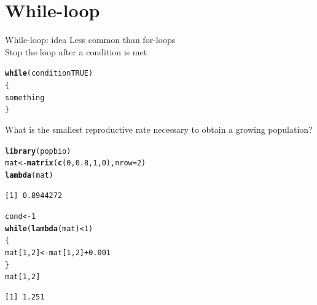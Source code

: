 \documentclass[10pt]{beamer}\usepackage[]{graphicx}\usepackage[]{color}
\makeatletter
\newcommand{\hlnum}[1]{\textcolor[rgb]{0.686,0.059,0.569}{#1}}%
\newcommand{\hlopt}[1]{\textcolor[rgb]{0,0,0}{#1}}%
\newcommand{\hlstd}[1]{\textcolor[rgb]{0.345,0.345,0.345}{#1}}%
\newcommand{\hlkwa}[1]{\textcolor[rgb]{0.161,0.373,0.58}{\textbf{#1}}}%
\newcommand{\hlkwb}[1]{\textcolor[rgb]{0.69,0.353,0.396}{#1}}%
\newcommand{\hlkwc}[1]{\textcolor[rgb]{0.333,0.667,0.333}{#1}}%
\newcommand{\hlkwd}[1]{\textcolor[rgb]{0.737,0.353,0.396}{\textbf{#1}}}%
\newenvironment{kframe}{%
 \def\at@end@of@kframe{}%
 \ifinner\ifhmode%
  \def\at@end@of@kframe{\end{minipage}}%
  \begin{minipage}{\columnwidth}%
 \fi\fi%
 \def\FrameCommand##1{\hskip\@totalleftmargin \hskip-\fboxsep
 \colorbox{shadecolor}{##1}\hskip-\fboxsep
     \hskip-\linewidth \hskip-\@totalleftmargin \hskip\columnwidth}%
 \MakeFramed {\advance\hsize-\width
   \@totalleftmargin\z@ \linewidth\hsize
   \@setminipage}}%
 {\par\unskip\endMakeFramed%
 \at@end@of@kframe}
\newenvironment{knitrout}{}{} %
\makeatother
\begin{document}

\section{While-loop}

\begin{frame}[fragile]{While-loop: idea}
Less common than for-loops\\
Stop the loop after a condition is met\\

\begin{knitrout}
\color{fgcolor}\begin{kframe}
\begin{alltt}
    \hlkwd{while}(condition TRUE)
    \{
      something
    \}
\end{alltt}
\end{kframe}
\end{knitrout}
  
\end{frame}

\begin{frame}[fragile]{What is the smallest reproductive rate necessary to obtain a growing population?}
\begin{knitrout}
\color{fgcolor}\begin{kframe}
\begin{alltt}
\hlkwd{library}\hlstd{(popbio)}
\hlstd{mat} \hlkwb{<-} \hlkwd{matrix}\hlstd{(}\hlkwd{c}\hlstd{(}\hlnum{0}\hlstd{,}\hlnum{0.8}\hlstd{,}\hlnum{1}\hlstd{,}\hlnum{0}\hlstd{),} \hlkwc{nrow} \hlstd{=} \hlnum{2}\hlstd{)}
\hlkwd{lambda}\hlstd{(mat)}
\end{alltt}
\begin{verbatim}
[1] 0.8944272
\end{verbatim}
\begin{alltt}
\hlstd{cond} \hlkwb{<-} \hlnum{1}
\hlkwa{while}\hlstd{(}\hlkwd{lambda}\hlstd{(mat)} \hlopt{<} \hlnum{1} \hlstd{)}
\hlstd{\{}
  \hlstd{mat[}\hlnum{1}\hlstd{,}\hlnum{2}\hlstd{]} \hlkwb{<-} \hlstd{mat[}\hlnum{1}\hlstd{,}\hlnum{2}\hlstd{]}\hlopt{+}\hlnum{0.001}
\hlstd{\}}
\hlstd{mat[}\hlnum{1}\hlstd{,}\hlnum{2}\hlstd{]}
\end{alltt}
\begin{verbatim}
[1] 1.251
\end{verbatim}
\end{kframe}
\end{knitrout}

\end{frame}
\end{document}
